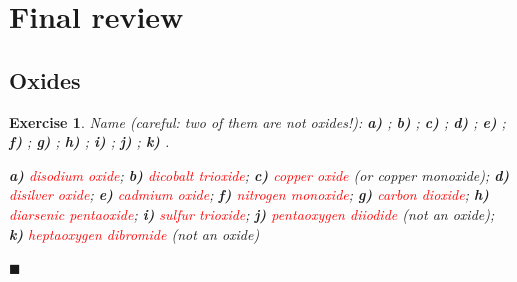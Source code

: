 \documentclass[12pt]{article}
\theoremstyle{mygreennumbox}
\newtheorem{ejercicioT}{Exercise}[section]
\newenvironment{exercise}{\begin{eBoxmygreen}\begin{ejercicioT}}{\hfill{\color{mygreen}\tiny\ensuremath{\blacksquare}}\end{ejercicioT}\end{eBoxmygreen}}
\begin{document}
\newpage
\section{Final review}

\subsection{Oxides}

\begin{exercise}
    Name (careful: two of them are not oxides!): \textbf{a)} ; \textbf{b)} ; \textbf{c)} ; \textbf{d)} ; \textbf{e)} ; \textbf{f)} ; \textbf{g)} ; \textbf{h)} ; \textbf{i)} ; \textbf{j)} ; \textbf{k)} .
    \begin{solu}
        \textbf{a)} \textcolor{red}{disodium oxide}; \textbf{b)} \textcolor{red}{dicobalt trioxide}; \textbf{c)} \textcolor{red}{copper oxide} (or copper monoxide); \textbf{d)} \textcolor{red}{disilver oxide}; \textbf{e)} \textcolor{red}{cadmium oxide}; \textbf{f)} \textcolor{red}{nitrogen monoxide}; \textbf{g)} \textcolor{red}{carbon dioxide}; \textbf{h)} \textcolor{red}{diarsenic pentaoxide}; \textbf{i)} \textcolor{red}{sulfur trioxide}; \textbf{j)} \textcolor{red}{pentaoxygen diiodide} (not an oxide); \textbf{k)} \textcolor{red}{heptaoxygen dibromide} (not an oxide)
    \end{solu}
\end{exercise}
\end{document}
